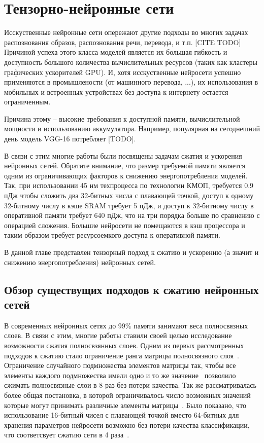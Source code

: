 \chapter{Тензорно-нейронные сети} \label{chap:tensornet}
Исскуственные нейронные сети опережают другие подходы во многих задачах распознования образов, распознования речи, перевода, и т.п. [CITE TODO]
Причиной успеха этого класса моделей является их большая гибкость и доступность большого количества вычислительных ресурсов (таких как кластеры графических ускорителей GPU).
И, хотя исскуственные нейросети успешно применяются в промышлености (от машинного перевода, ...), их использования в мобильных и встроенных устройствах без доступа к интернету остается ограниченным.

Причина этому -- высокие требования к доступной памяти, вычислительной мощности и использованию аккумулятора. Например, популярная на сегоднешний день модель VGG-16 потребляет [TODO].

В связи с этим многие работы были посвящены задачам сжатия и ускорения нейронных сетей. Обратите внимание, что размер требуемой памяти является одним из ограничивающих факторов к снижению энергопотребления моделей. Так, при использовании 45 нм техпроцесса по технологии КМОП, требуется 0.9 пДж чтобы сложить два 32-битных числа с плавающей точкой, доступ к одному 32-битному числу в кэше SRAM требует 5 пДж, и доступ к 32-битному числу в оперативной памяти требует 640 пДж, что на три порядка больше по сравнению с операцией сложения. Большие нейросети не помещаются в кэш процессора и таким образом требует ресурсоемкого доступа к оперативной памяти.

В данной главе представлен тензорный подход к сжатию и ускорению (а значит и снижению энергопотребления) нейронных сетей.

\section{Обзор существущих подходов к сжатию нейронных сетей} \label{sec:tensornet-alternatives}
В современных нейронных сетях до 99\% памяти занимают веса полносвязных слоев. В связи с этим, многие работы ставили своей целью исследование возможности сжатия полносвзянных слоев. Одним из первых рассмотренных подходов к сжатию стало ограничение ранга матрицы полносвязного слоя~\cite{Denil2013predicting}. Ограничение случайного подмножества элементов матрицы так, чтобы все элементы каждого подмножества имели одно и то же значение~\cite{chen2015compressing} позволило сжимать полносвязные слои в 8 раз без потери качества. Так же рассматривалась более общая постановка, в которой ограничивалось число возможных значений которые могут принимать различные элементы матрицы~\cite{gong2014PQcompressing}. Было показано, что использование 16-битный чисел с плавающей точкой вместо 64-битных  для хранения параметров нейросети возможно без потери качества классификации, что соответсвует сжатию сети в 4 раза~\cite{Gupta2015floatingPoint}.


